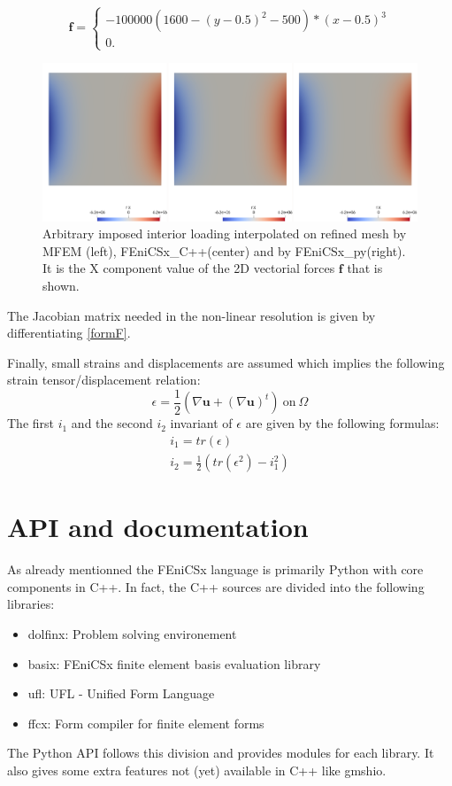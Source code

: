 \documentclass[12pt]{article}
\newcommand{\f}[1]{FEniCSx#1}
\newcommand{\vm}[1]{
	{\ensuremath{\mathbf{#1}}}
}
\newcommand{\tens}[1]{
	{\ensuremath{\mathsf{#1}}}
}
\begin{document}
\begin{equation}
\vm{f}=\left\{ \begin{array}{l}
		-100000 (1600-(y-0.5)^2-500)*(x-0.5)^3\\
		0.
\end{array}\right.
\label{load1}
\end{equation}
\begin{figure}
	\includegraphics[width=1.\textwidth]{load.png}
	\caption{Arbitrary imposed interior loading interpolated on refined mesh by MFEM (left), \f{\_C++}(center) and by \f{\_py}(right). It is the X component value of the 2D vectorial forces $\vm{f}$ that is shown.\label{load}}
\end{figure}
The Jacobian matrix needed in the non-linear resolution is given by differentiating \eqref{formF}.

Finally, small strains and displacements are assumed which  implies the following strain tensor/displacement relation: 
\begin{equation}
	\tens{\epsilon}=\frac{1}{2}\left(\nabla\vm{u} +\left(\nabla \vm{u}\right)^t\right)~\text{on}~\Omega
	\label{eps}
\end{equation}
The first $i_1$ and the second $i_2$ invariant of $\tens{\epsilon}$ are given by the following formulas:
 \begin{equation}
 	\begin{array}{l}
 		i_1=tr(\tens{\epsilon})\\
 		i_2=\frac{1}{2}\left( tr(\tens{\epsilon}^2)- i_1^2 \right)
 	\end{array}\label{invariants} 
 \end{equation}

\section{API and documentation}

As already mentionned the \f{} language is primarily Python with core components in C++. 
In fact, the C++ sources are divided into the following libraries:
\begin{itemize}
	\item dolfinx: Problem solving environement
	\item basix: \f{} finite element basis evaluation library 
	\item ufl: UFL - Unified Form Language 
	\item ffcx: Form compiler for finite element forms 
\end{itemize}
The Python API follows this division and provides modules for each library. 
It also gives some extra features not (yet) available in C++ like gmshio.  
\end{document}

